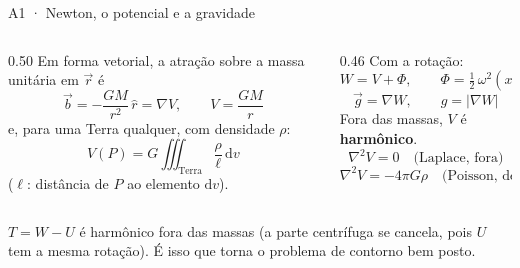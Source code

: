 \documentclass[aspectratio=169,11pt]{beamer}
\begin{document}
\begin{frame}{A1 · Newton, o potencial e a gravidade}
  \small
  \begin{columns}[T]
    \begin{column}{0.50\textwidth}
      Em forma vetorial, a atração sobre a massa unitária em $\vec r$ é
      \[ \vec b = -\frac{G M}{r^2}\,\hat r = \nabla V, \qquad V = \frac{GM}{r} \]
      e, para uma Terra qualquer, com densidade $\rho$:
      \[ V(P) = G \iiint_{\text{Terra}} \frac{\rho}{\ell}\, \mathrm{d}v \]
      ($\ell$: distância de $P$ ao elemento $\mathrm{d}v$).
    \end{column}
    \begin{column}{0.46\textwidth}
      Com a rotação:
      \[ W = V + \Phi, \qquad \Phi = \tfrac{1}{2}\,\omega^2 (x^2 + y^2) \]
      \[ \vec g = \nabla W, \qquad g = |\nabla W| \]
      Fora das massas, $V$ é \textbf{harmônico}.
      \[ \nabla^2 V = 0 \quad \text{(Laplace, fora)} \]
      \[ \nabla^2 V = -4\pi G \rho \quad \text{(Poisson, dentro)} \]
    \end{column}
  \end{columns}
  \medskip
  \begin{cuidado}[title={Por que isso importa para Stokes}]
    $T = W - U$ é harmônico fora das massas (a parte centrífuga se cancela, pois $U$ tem a
    mesma rotação). É isso que torna o problema de contorno bem posto.
  \end{cuidado}
\end{frame}
\end{document}
